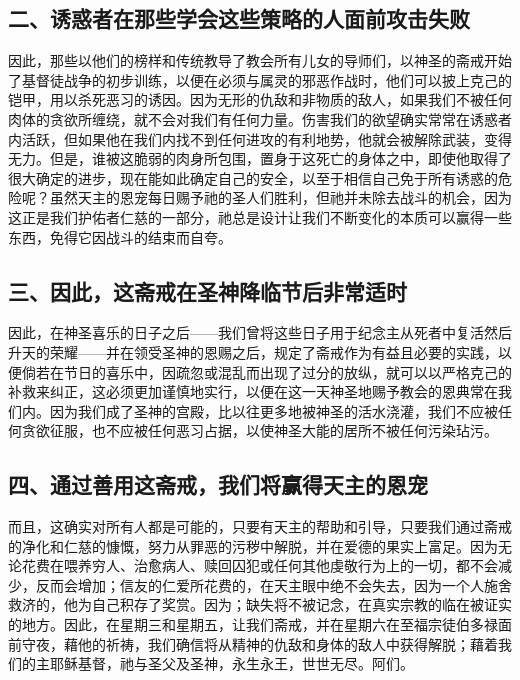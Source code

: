 
\subsection{二、诱惑者在那些学会这些策略的人面前攻击失败}

因此，那些以他们的榜样和传统教导了教会所有儿女的导师们，以神圣的斋戒开始了基督徒战争的初步训练，以便在必须与属灵的邪恶作战时，他们可以披上克己的铠甲，用以杀死恶习的诱因。因为无形的仇敌和非物质的敌人，如果我们不被任何肉体的贪欲所缠绕，就不会对我们有任何力量。伤害我们的欲望确实常常在诱惑者内活跃，但如果他在我们内找不到任何进攻的有利地势，他就会被解除武装，变得无力。但是，谁被这脆弱的肉身所包围，置身于这死亡的身体之中，即使他取得了很大确定的进步，现在能如此确定自己的安全，以至于相信自己免于所有诱惑的危险呢？虽然天主的恩宠每日赐予祂的圣人们胜利，但祂并未除去战斗的机会，因为这正是我们护佑者仁慈的一部分，祂总是设计让我们不断变化的本质可以赢得一些东西，免得它因战斗的结束而自夸。\par


\subsection{三、因此，这斋戒在圣神降临节后非常适时}

因此，在神圣喜乐的日子之后——我们曾将这些日子用于纪念主从死者中复活然后升天的荣耀——并在领受圣神的恩赐之后，规定了斋戒作为有益且必要的实践，以便倘若在节日的喜乐中，因疏忽或混乱而出现了过分的放纵，就可以以严格克己的补救来纠正，这必须更加谨慎地实行，以便在这一天神圣地赐予教会的恩典常在我们内。因为我们成了圣神的宫殿，比以往更多地被神圣的活水浇灌，我们不应被任何贪欲征服，也不应被任何恶习占据，以使神圣大能的居所不被任何污染玷污。\par


\subsection{四、通过善用这斋戒，我们将赢得天主的恩宠}

而且，这确实对所有人都是可能的，只要有天主的帮助和引导，只要我们通过斋戒的净化和仁慈的慷慨，努力从罪恶的污秽中解脱，并在爱德的果实上富足。因为无论花费在喂养穷人、治愈病人、赎回囚犯或任何其他虔敬行为上的一切，都不会减少，反而会增加；信友的仁爱所花费的，在天主眼中绝不会失去，因为一个人施舍救济的，他为自己积存了奖赏。因为；缺失将不被记念，在真实宗教的临在被证实的地方。因此，在星期三和星期五，让我们斋戒，并在星期六在至福宗徒伯多禄面前守夜，藉他的祈祷，我们确信将从精神的仇敌和身体的敌人中获得解脱；藉着我们的主耶稣基督，祂与圣父及圣神，永生永王，世世无尽。阿们。\par

